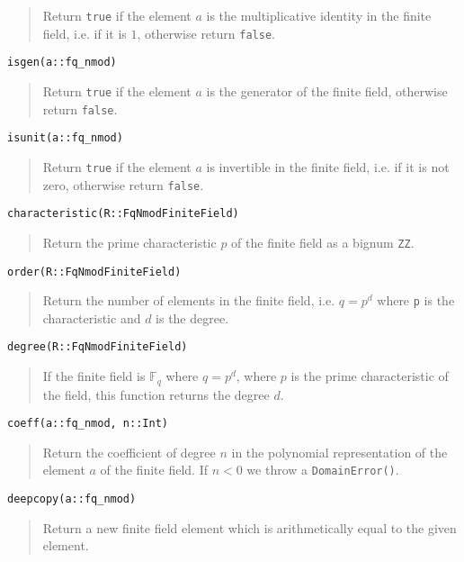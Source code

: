 \documentclass[a4paper,10pt]{article}
\newcommand{\F}{\mathbb{F}}
\newcommand{\code}{\lstinline}
\newcommand{\desc}[1]{\vspace{-3mm}\begin{quote}#1\end{quote}}
\begin{document}
{{\desc{Return \code{true} if the element $a$ is the multiplicative identity in
the finite field, i.e. if it is $1$, otherwise return \code{false}.}

\begin{lstlisting}
isgen(a::fq_nmod)
\end{lstlisting}

\desc{Return \code{true} if the element $a$ is the generator of the finite field,
otherwise return \code{false}.}

\begin{lstlisting}
isunit(a::fq_nmod)
\end{lstlisting}

\desc{Return \code{true} if the element $a$ is invertible in the finite field,
i.e. if it is not zero, otherwise return \code{false}.}

\begin{lstlisting}
characteristic(R::FqNmodFiniteField)
\end{lstlisting}

\desc{Return the prime characteristic $p$ of the finite field as a bignum
\code{ZZ}.}

\begin{lstlisting}
order(R::FqNmodFiniteField)
\end{lstlisting}

\desc{Return the number of elements in the finite field, i.e. $q = p^d$
where \code{p} is the characteristic and $d$ is the degree.}

\begin{lstlisting}
degree(R::FqNmodFiniteField)
\end{lstlisting}

\desc{If the finite field is $\F_q$ where $q = p^d$, where $p$ is the
prime characteristic of the field, this function returns the degree
$d$.}

\begin{lstlisting}
coeff(a::fq_nmod, n::Int)
\end{lstlisting}

\desc{Return the coefficient of degree $n$ in the polynomial representation
of the element $a$ of the finite field. If $n < 0$ we throw a
\code{DomainError()}.}

\begin{lstlisting}
deepcopy(a::fq_nmod)
\end{lstlisting}

\desc{Return a new finite field element which is arithmetically equal to
the given element.}

}}
\end{document}
